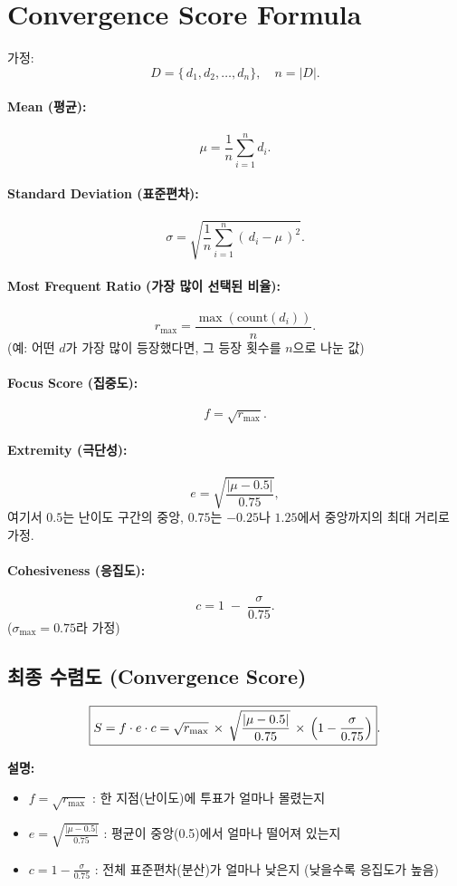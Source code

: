 \documentclass[12pt]{article}
\begin{document}
\section*{Convergence Score Formula}

가정:
\[
D = \{\,d_1, d_2, \dots, d_n\},
\quad
n = |D|.
\]

\paragraph{Mean (평균):}
\[
\mu = \frac{1}{n}\sum_{i=1}^{n} d_i.
\]

\paragraph{Standard Deviation (표준편차):}
\[
\sigma = \sqrt{\frac{1}{n} \sum_{i=1}^{n} (\,d_i - \mu\,)^2}.
\]

\paragraph{Most Frequent Ratio (가장 많이 선택된 비율):}
\[
r_{\max}
= \frac{\max(\text{count}(d_i))}{n}.
\]
(예: 어떤 $d$가 가장 많이 등장했다면, 그 등장 횟수를 $n$으로 나눈 값)

\paragraph{Focus Score (집중도):}
\[
f = \sqrt{r_{\max}}.
\]

\paragraph{Extremity (극단성):}
\[
e = \sqrt{\frac{\lvert \mu - 0.5\rvert}{0.75}},
\]
여기서 $0.5$는 난이도 구간의 중앙, $0.75$는 $-0.25$나 $1.25$에서 중앙까지의 최대 거리로 가정.

\paragraph{Cohesiveness (응집도):}
\[
c = 1 \;-\; \frac{\sigma}{0.75}.
\]
($\sigma_{\max} = 0.75$라 가정)

\subsection*{최종 수렴도 (Convergence Score)}

\[
\boxed{
S
= f \cdot e \cdot c
= \sqrt{r_{\max}}
\,\times\,
\sqrt{\frac{\lvert \mu - 0.5\rvert}{0.75}}
\,\times\,
\Bigl(1 - \frac{\sigma}{0.75}\Bigr)
}.
\]

\vspace{2em}
\noindent
\textbf{설명:}
\begin{itemize}
\item $f = \sqrt{r_{\max}}$ : 한 지점(난이도)에 투표가 얼마나 몰렸는지
\item $e = \sqrt{\frac{\lvert \mu - 0.5\rvert}{0.75}}$ : 평균이 중앙(0.5)에서 얼마나 떨어져 있는지
\item $c = 1 - \frac{\sigma}{0.75}$ : 전체 표준편차(분산)가 얼마나 낮은지 (낮을수록 응집도가 높음)
\end{itemize}
\end{document}
